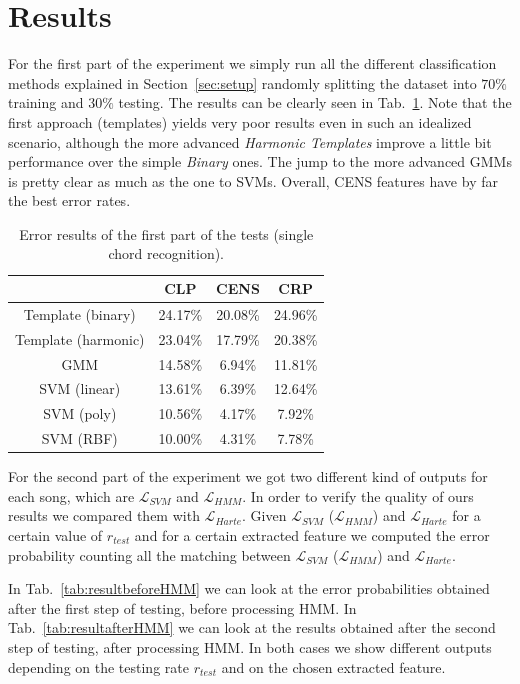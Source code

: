\section{Results}
\label{sec:results}

For the first part of the experiment we simply run all the different classification methods explained in Section~\ref{sec:setup} randomly splitting the dataset into $70\%$ training and $30\%$ testing. The results can be clearly seen in Tab.~\ref{tab:singleChordResults}. Note that the first approach (templates) yields very poor results even in such an idealized scenario, although the more advanced \textit{Harmonic Templates} improve a little bit performance over the simple \textit{Binary} ones. The jump to the more advanced GMMs is pretty clear as much as the one to SVMs. Overall, CENS features have by far the best error rates.

\begin{table}[t]
\centering
\begin{tabular}{|c|c|c|c|}
	\hline 
	& CLP & CENS & CRP \\ 
	\hline 
	Template (binary) & 24.17\% & 20.08\% & 24.96\% \\
	\hline
	Template (harmonic) & 23.04\% & 17.79\% & 20.38\% \\
	\hline
	GMM & 14.58\% & 6.94\% & 11.81\% \\ 
	\hline 
	SVM (linear) & 13.61\% & 6.39\% & 12.64\% \\ 
	\hline 
	SVM (poly) & 10.56\% & 4.17\% & 7.92\% \\ 
	\hline 
	SVM (RBF) & 10.00\% & 4.31\% & 7.78\% \\ 
	\hline 
\end{tabular}
\caption{Error results of the first part of the tests (single chord recognition).}
\label{tab:singleChordResults}
\end{table}


For the second part of the experiment we got two different kind of outputs for each song, which are $\mathcal{L}_{SVM}$ and $\mathcal{L}_{HMM}$. In order to verify the quality of ours results we compared them with  $\mathcal{L}_{Harte}$. Given $\mathcal{L}_{SVM}$ ($\mathcal{L}_{HMM}$) and $\mathcal{L}_{Harte}$ for a certain value of $r_{test}$ and for a certain extracted feature we computed the error probability counting all the matching between $\mathcal{L}_{SVM}$ ($\mathcal{L}_{HMM}$) and $\mathcal{L}_{Harte}$.

 In Tab.~\ref{tab:resultbeforeHMM} we can look at the error probabilities obtained after the first step of testing, before processing HMM. In Tab.~\ref{tab:resultafterHMM} we can look at the results obtained after the second step of testing, after processing HMM. In both cases we show different outputs depending on the testing rate $r_{test}$ and on the chosen extracted feature.

